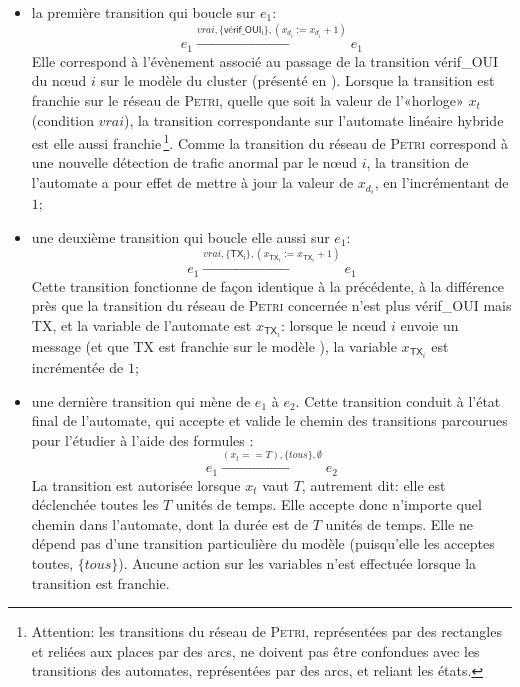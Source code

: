 \begin{itemize}
    \item la première transition qui boucle sur $e_1$:
        \[e_1\xrightarrow{\mathit{vrai},\{\mathsf{vérif\_OUI_i}\},(x_{d_i}:=x_{d_i}+1)}{e_1}\]
        Elle correspond à l'évènement associé au passage de la transition \textsf{vérif\_OUI} du nœud $i$ sur le modèle \rpsge du cluster (présenté en ).
        Lorsque la transition est franchie sur le réseau de \textsc{Petri}, quelle que soit la valeur de l'«horloge» $x_t$ (condition $\mathit{vrai}$), la transition correspondante sur l'automate linéaire hybride est elle aussi franchie\,\footnote{Attention: les transitions du réseau de \textsc{Petri}, représentées par des rectangles et reliées aux places par des arcs, ne doivent pas être confondues avec les transitions des automates, représentées par des arcs, et reliant les états.}.
        Comme la transition du réseau de \textsc{Petri} correspond à une nouvelle détection de trafic anormal par le nœud $i$, la transition de l'automate a pour effet de mettre à jour la valeur de $x_{d_i}$, en l'incrémentant de $1$;
    \item une deuxième transition qui boucle elle aussi sur $e_1$:
        \[e_1\xrightarrow{\mathit{vrai},\{\mathsf{TX_i}\},(x_{\mathsf{TX}_i}:=x_{\mathsf{TX}_i}+1)}{e_1}\]
        Cette transition fonctionne de façon identique à la précédente, à la différence près que la transition du réseau de \textsc{Petri} concernée n'est plus \textsf{vérif\_OUI} mais \textsf{TX}, et la variable de l'automate est $x_{\mathsf{TX}_i}$: lorsque le nœud $i$ envoie un message (et que \textsf{TX} est franchie sur le modèle \rpsge), la variable $x_{\mathsf{TX}_i}$ est incrémentée de $1$;
    \item une dernière transition qui mène de $e_1$ à $e_2$.
        Cette transition conduit à l'état final de l'automate, qui accepte et valide le chemin des transitions parcourues pour l'étudier à l'aide des formules \lsah:
        \[e_1\xrightarrow{(x_t==T),\{\mathit{tous}\},\emptyset}{e_2}\]
        La transition est autorisée lorsque $x_t$ vaut $T$, autrement dit: elle est déclenchée toutes les $T$ unités de temps.
        Elle accepte donc n'importe quel chemin dans l'automate, dont la durée est de $T$ unités de temps.
        Elle ne dépend pas d'une transition particulière du modèle \rpsge (puisqu'elle les acceptes toutes, $\{\mathit{tous}\}$).
        Aucune action sur les variables n'est effectuée lorsque la transition est franchie.
\end{itemize}

